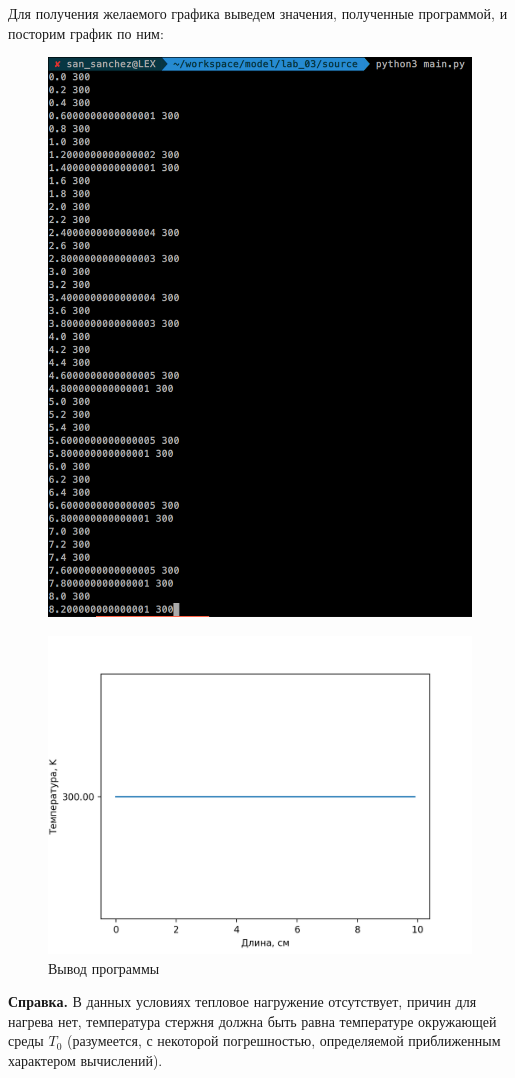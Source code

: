 \begin{enumerate}
Для получения желаемого графика выведем значения, полученные программой, и посторим график по ним:
\begin{figure}[H]
    \centering
    \includegraphics[scale=0.6]{data/pdf/res.png}
\end{figure}
\begin{figure}[H]
    \centering
    \includegraphics[scale=0.9]{data/pdf/graph4.png}
	\caption{Вывод программы}
\end{figure}


\textbf{Справка.}
В данных условиях тепловое нагружение отсутствует, причин для нагрева нет, температура стержня должна быть равна температуре окружающей среды $T_0$  (разумеется, с некоторой погрешностью, определяемой приближенным характером вычислений).
\end{enumerate}

